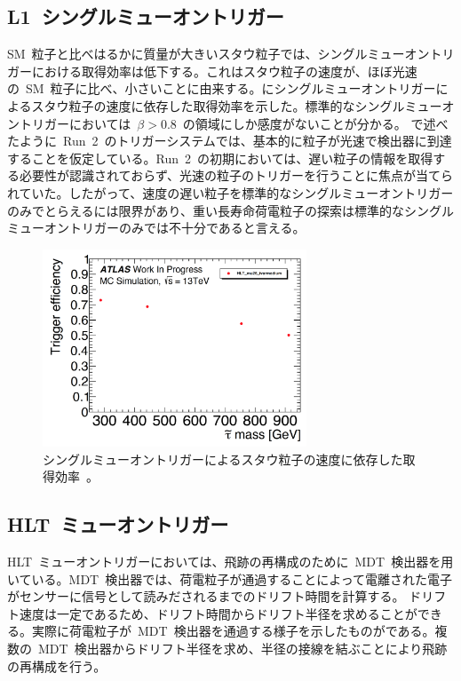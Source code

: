 \subsection{L1~シングルミューオントリガー}
SM~粒子と比べはるかに質量が大きいスタウ粒子では、シングルミューオントリガーにおける取得効率は低下する。これはスタウ粒子の速度が、ほぼ光速の~SM~粒子に比べ、小さいことに由来する。にシングルミューオントリガーによるスタウ粒子の速度に依存した取得効率を示した。標準的なシングルミューオントリガーにおいては~$\beta>0.8$~の領域にしか感度がないことが分かる。
で述べたように~Run~2~のトリガーシステムでは、基本的に粒子が光速で検出器に到達することを仮定している。Run~2~の初期においては、遅い粒子の情報を取得する必要性が認識されておらず、光速の粒子のトリガーを行うことに焦点が当てられていた。したがって、速度の遅い粒子を標準的なシングルミューオントリガーのみでとらえるには限界があり、重い長寿命荷電粒子の探索は標準的なシングルミューオントリガーのみでは不十分であると言える。
\begin{figure}[H]
        \centering   
        \includegraphics[width=0.7\textwidth,page=2]{img/pdf3/sumi.pdf}
        \caption[シングルミューオントリガーによるスタウ粒子の速度に依存した取得効率]{シングルミューオントリガーによるスタウ粒子の速度に依存した取得効率~\cite{MT:01}。}
        \label{fig:sumi2}
\end{figure}

\subsection{HLT~ミューオントリガー}
HLT~ミューオントリガーにおいては、飛跡の再構成のために~MDT~検出器を用いている。MDT~検出器では、荷電粒子が通過することによって電離された電子がセンサーに信号として読みだされるまでのドリフト時間を計算する。
ドリフト速度は一定であるため、ドリフト時間からドリフト半径を求めることができる。実際に荷電粒子が~MDT~検出器を通過する様子を示したものがである。複数の~MDT~検出器からドリフト半径を求め、半径の接線を結ぶことにより飛跡の再構成を行う。


